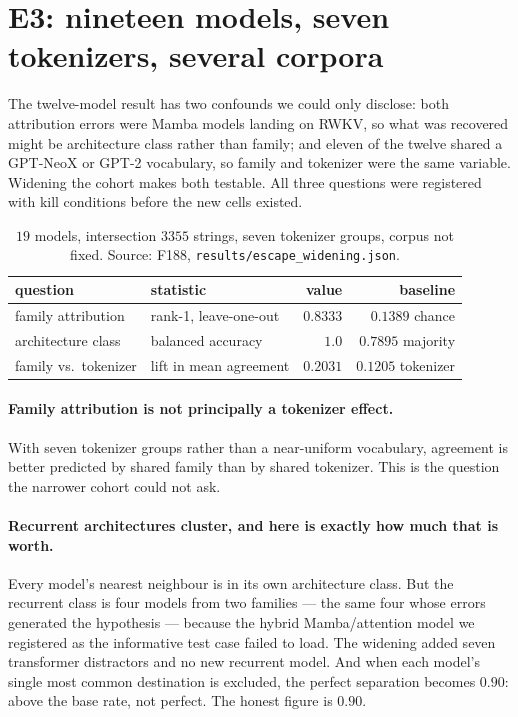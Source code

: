 \documentclass[11pt]{article}
\begin{document}
\section{E3: nineteen models, seven tokenizers, several corpora}\label{sec:e3}

The twelve-model result has two confounds we could only disclose: both attribution errors were Mamba
models landing on RWKV, so what was recovered might be architecture class rather than family; and
eleven of the twelve shared a GPT-NeoX or GPT-2 vocabulary, so family and tokenizer were the same
variable. Widening the cohort makes both testable. All three questions were registered with kill
conditions before the new cells existed.

\begin{table}[t]\centering\small
\begin{tabular}{llrr}
\toprule
question & statistic & value & baseline \\
\midrule
family attribution & rank-1, leave-one-out & $0.8333$ & $0.1389$ chance \\
architecture class & balanced accuracy & $1.0$ & $0.7895$ majority \\
family vs.\ tokenizer & lift in mean agreement & $0.2031$ & $0.1205$ tokenizer \\
\bottomrule
\end{tabular}
\caption{$19$ models, intersection $3355$ strings, seven tokenizer groups, corpus not fixed. Source:
F188, \texttt{results/escape\_widening.json}.}
\label{tab:e3}
\end{table}

\paragraph{Family attribution is not principally a tokenizer effect.} With seven tokenizer groups
rather than a near-uniform vocabulary, agreement is better predicted by shared family than by shared
tokenizer. This is the question the narrower cohort could not ask.

\paragraph{Recurrent architectures cluster, and here is exactly how much that is worth.} Every model's
nearest neighbour is in its own architecture class. But the recurrent class is four models from two
families --- the same four whose errors generated the hypothesis --- because the hybrid
Mamba/attention model we registered as the informative test case failed to load. The widening added
seven transformer distractors and no new recurrent model. And when each model's single most common
destination is excluded, the perfect separation becomes $0.90$: above the base rate, not perfect. The
honest figure is $0.90$.
\end{document}
